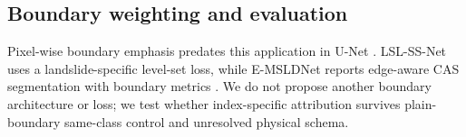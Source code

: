 \subsection{Boundary weighting and evaluation}

Pixel-wise boundary emphasis predates this application in U-Net \citep{ronneberger2015unet}. LSL-SS-Net uses a landslide-specific level-set loss, while E-MSLDNet reports edge-aware CAS segmentation with boundary metrics \citep{yang2024lslssnet,zhao2025emsldnet}. We do not propose another boundary architecture or loss; we test whether index-specific attribution survives plain-boundary same-class control and unresolved physical schema.
